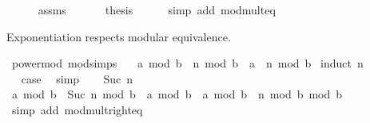 \begin{isabellebody}
\ \ \ \ \isamarkupfalse%
\ assms\ \isacommand{{\isachardot}{\kern0pt}{\isachardot}{\kern0pt}}\isamarkupfalse%
\isanewline
\ \ \isamarkupfalse%
\ \isamarkupfalse%
\ {\isacharquery}{\kern0pt}thesis\isanewline
\ \ \ \ \isamarkupfalse%
\ {\isacharparenleft}{\kern0pt}simp\ add{\isacharcolon}{\kern0pt}\ mod{\isacharunderscore}{\kern0pt}mult{\isacharunderscore}{\kern0pt}eq{\isacharparenright}{\kern0pt}\isanewline
{}\isamarkupfalse%
%
\endisatagproof
{\isafoldproof}%
%
\isadelimproof
%
\endisadelimproof
%
\begin{isamarkuptext}%
Exponentiation respects modular equivalence.%
\end{isamarkuptext}\isamarkuptrue%
\isamarkupfalse%
\ power{\isacharunderscore}{\kern0pt}mod\ {\isacharbrackleft}{\kern0pt}mod{\isacharunderscore}{\kern0pt}simps{\isacharbrackright}{\kern0pt}{\isacharcolon}{\kern0pt}\ \isanewline
\ \ {\isachardoublequoteopen}{\isacharparenleft}{\kern0pt}{\isacharparenleft}{\kern0pt}a\ mod\ b{\isacharparenright}{\kern0pt}\ {\isacharcircum}{\kern0pt}\ n{\isacharparenright}{\kern0pt}\ mod\ b\ {\isacharequal}{\kern0pt}\ {\isacharparenleft}{\kern0pt}a\ {\isacharcircum}{\kern0pt}\ n{\isacharparenright}{\kern0pt}\ mod\ b{\isachardoublequoteclose}\isanewline
%
\isadelimproof
%
\endisadelimproof
%
\isatagproof
{}\isamarkupfalse%
\ {\isacharparenleft}{\kern0pt}induct\ n{\isacharparenright}{\kern0pt}\isanewline
\ \ \isamarkupfalse%
\ {}\isanewline
\ \ \isamarkupfalse%
\ \isamarkupfalse%
\ {\isacharquery}{\kern0pt}case\ \isamarkupfalse%
\ simp\isanewline
{}\isamarkupfalse%
\isanewline
\ \ \isamarkupfalse%
\ {\isacharparenleft}{\kern0pt}Suc\ n{\isacharparenright}{\kern0pt}\isanewline
\ \ \isamarkupfalse%
\ {\isachardoublequoteopen}{\isacharparenleft}{\kern0pt}a\ mod\ b{\isacharparenright}{\kern0pt}\ {\isacharcircum}{\kern0pt}\ Suc\ n\ mod\ b\ {\isacharequal}{\kern0pt}\ {\isacharparenleft}{\kern0pt}a\ mod\ b{\isacharparenright}{\kern0pt}\ {\isacharasterisk}{\kern0pt}\ {\isacharparenleft}{\kern0pt}{\isacharparenleft}{\kern0pt}a\ mod\ b{\isacharparenright}{\kern0pt}\ {\isacharcircum}{\kern0pt}\ n\ mod\ b{\isacharparenright}{\kern0pt}\ mod\ b{\isachardoublequoteclose}\isanewline
\ \ \ \ \isamarkupfalse%
\ {\isacharparenleft}{\kern0pt}simp\ add{\isacharcolon}{\kern0pt}\ mod{\isacharunderscore}{\kern0pt}mult{\isacharunderscore}{\kern0pt}right{\isacharunderscore}{\kern0pt}eq{\isacharparenright}{\kern0pt}\isanewline

\end{isabellebody}
